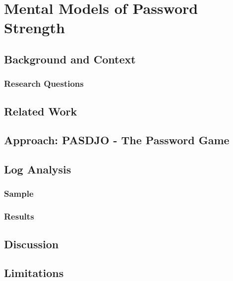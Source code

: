 \chapter[Mental Models of Password Strength]{Mental Models of Password Strength}\label{chap:mental_models}


\section{Background and Context}

\subsection{Research Questions}

\section{Related Work}

\section{Approach: PASDJO - The Password Game}


\section{Log Analysis}

\subsection{Sample}
\subsection{Results}


\section{Discussion}


\section{Limitations}

